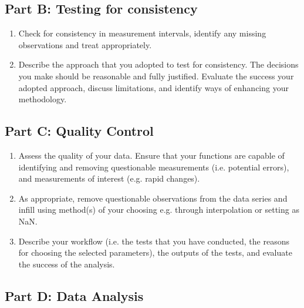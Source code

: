\documentclass[11pt,onecolumn,a4paper,notitlepage]{article}
\begin{document}
\subsection*{Part B: Testing for consistency}

\begin{enumerate}[resume]
\item{Check for consistency in measurement intervals, identify any missing observations and treat appropriately.}
\item{Describe the approach that you adopted to test for consistency. The decisions you make should be reasonable and fully justified. Evaluate the success your adopted approach, discuss limitations, and identify ways of enhancing your methodology.}
\end{enumerate}


\subsection*{Part C: Quality Control}
\begin{enumerate}[resume]

\item{Assess the quality of your data. Ensure that your functions are capable of identifying and removing questionable measurements (i.e. potential errors), and measurements of interest (e.g. rapid changes).}
\item{As appropriate, remove questionable observations from the data series and infill using method(s) of your choosing e.g. through interpolation or setting as NaN.}
\item{Describe your workflow (i.e. the tests that you have conducted, the reasons for choosing the selected parameters), the outputs of the tests, and evaluate the success of the analysis.}
\end{enumerate}


\subsection*{Part D: Data Analysis}
\end{document}

